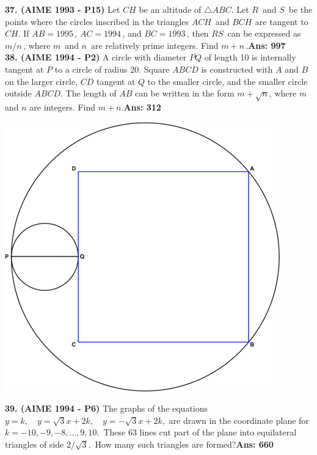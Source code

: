 \documentclass[letterpaper,10pt,addpoints]{exam}
\begin{document}
\textbf{37. (AIME 1993 - P15) }Let $\overline{CH}$ be an altitude of $\triangle ABC$. Let $R\,$ and $S\,$ be the points where the circles inscribed in the triangles $ACH\,$ and $BCH^{}_{}$ are tangent to $\overline{CH}$. If $AB = 1995\,$, $AC = 1994\,$, and $BC = 1993\,$, then $RS\,$ can be expressed as $m/n\,$, where $m\,$ and $n\,$ are relatively prime integers. Find $m + n\,$.\quad\textbf{Ans: 997}\\

\textbf{38. (AIME 1994 - P2) }A circle with diameter $\overline{PQ}$ of length 10 is internally tangent at $P$ to a circle of radius 20. Square $ABCD$ is constructed with $A$ and $B$ on the larger circle, $\overline{CD}$ tangent at $Q$ to the smaller circle, and the smaller circle outside $ABCD$. The length of $\overline{AB}$ can be written in the form $m + \sqrt{n}$, where $m$ and $n$ are integers. Find $m + n$.\quad\textbf{Ans: 312}

\begin{center}
\includegraphics[scale=0.4]{AIME_1994_Problem_2.png}
\end{center}

\textbf{39. (AIME 1994 - P6) }The graphs of the equations $y=k, \quad y=\sqrt{3}x+2k, \quad y=-\sqrt{3}x+2k,$ are drawn in the coordinate plane for $k=-10,-9,-8,\ldots,9,10.\,$ These 63 lines cut part of the plane into equilateral triangles of side $2/\sqrt{3}.\,$ How many such triangles are formed?\quad\textbf{Ans: 660}\\
\end{document}
